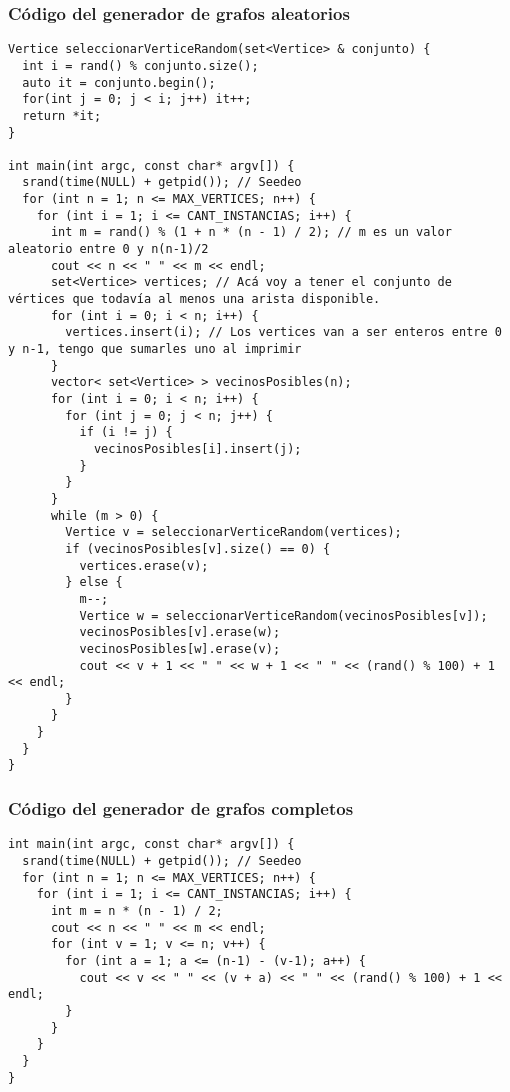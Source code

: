 \subsubsection{Código del generador de grafos aleatorios}
\begin{lstlisting}[frame=single]
Vertice seleccionarVerticeRandom(set<Vertice> & conjunto) {
  int i = rand() % conjunto.size();
  auto it = conjunto.begin();
  for(int j = 0; j < i; j++) it++;
  return *it;
}

int main(int argc, const char* argv[]) {
  srand(time(NULL) + getpid()); // Seedeo
  for (int n = 1; n <= MAX_VERTICES; n++) {
    for (int i = 1; i <= CANT_INSTANCIAS; i++) {
      int m = rand() % (1 + n * (n - 1) / 2); // m es un valor aleatorio entre 0 y n(n-1)/2
      cout << n << " " << m << endl;
      set<Vertice> vertices; // Acá voy a tener el conjunto de vértices que todavía al menos una arista disponible.
      for (int i = 0; i < n; i++) {
        vertices.insert(i); // Los vertices van a ser enteros entre 0 y n-1, tengo que sumarles uno al imprimir
      }
      vector< set<Vertice> > vecinosPosibles(n);
      for (int i = 0; i < n; i++) {
        for (int j = 0; j < n; j++) {
          if (i != j) {
            vecinosPosibles[i].insert(j);
          }
        }
      }
      while (m > 0) {
        Vertice v = seleccionarVerticeRandom(vertices);
        if (vecinosPosibles[v].size() == 0) {
          vertices.erase(v);
        } else {
          m--;
          Vertice w = seleccionarVerticeRandom(vecinosPosibles[v]);
          vecinosPosibles[v].erase(w);
          vecinosPosibles[w].erase(v);
          cout << v + 1 << " " << w + 1 << " " << (rand() % 100) + 1 << endl;
        }
      }
    }
  }
}
\end{lstlisting}

\subsubsection{Código del generador de grafos completos}
\begin{lstlisting}[frame=single]
int main(int argc, const char* argv[]) {
  srand(time(NULL) + getpid()); // Seedeo
  for (int n = 1; n <= MAX_VERTICES; n++) {
    for (int i = 1; i <= CANT_INSTANCIAS; i++) {
      int m = n * (n - 1) / 2;
      cout << n << " " << m << endl;
      for (int v = 1; v <= n; v++) {
        for (int a = 1; a <= (n-1) - (v-1); a++) {
          cout << v << " " << (v + a) << " " << (rand() % 100) + 1 << endl;
        }
      }
    }
  }
}
\end{lstlisting}

